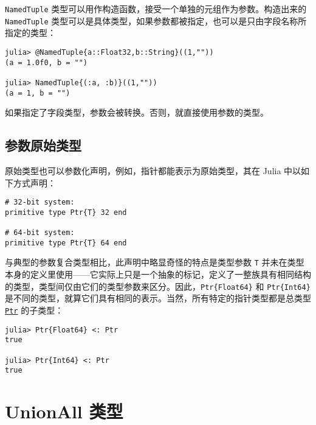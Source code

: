 \texttt{NamedTuple} 类型可以用作构造函数，接受一个单独的元组作为参数。构造出来的 \texttt{NamedTuple} 类型可以是具体类型，如果参数都被指定，也可以是只由字段名称所指定的类型：




\begin{verbatim}
julia> @NamedTuple{a::Float32,b::String}((1,""))
(a = 1.0f0, b = "")

julia> NamedTuple{(:a, :b)}((1,""))
(a = 1, b = "")
\end{verbatim}



如果指定了字段类型，参数会被转换。否则，就直接使用参数的类型。



\hypertarget{2858316496912626713}{}


\subsection{参数原始类型}



原始类型也可以参数化声明，例如，指针都能表示为原始类型，其在 Julia 中以如下方式声明：




\begin{verbatim}
# 32-bit system:
primitive type Ptr{T} 32 end

# 64-bit system:
primitive type Ptr{T} 64 end
\end{verbatim}



与典型的参数复合类型相比，此声明中略显奇怪的特点是类型参数 \texttt{T} 并未在类型本身的定义里使用——它实际上只是一个抽象的标记，定义了一整族具有相同结构的类型，类型间仅由它们的类型参数来区分。因此，\texttt{Ptr\{Float64\}} 和 \texttt{Ptr\{Int64\}} 是不同的类型，就算它们具有相同的表示。当然，所有特定的指针类型都是总类型 \hyperlink{10630331440513004826}{\texttt{Ptr}} 的子类型：




\begin{verbatim}
julia> Ptr{Float64} <: Ptr
true

julia> Ptr{Int64} <: Ptr
true
\end{verbatim}



\hypertarget{1421020605730253291}{}


\section{UnionAll 类型}



